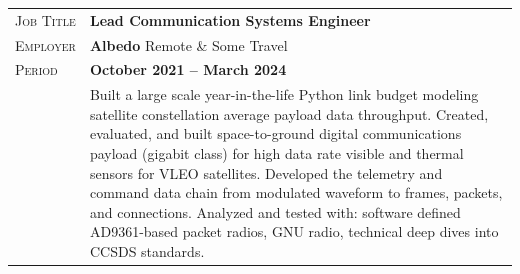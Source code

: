 \documentclass[a4paper, oneside, final]{scrartcl}
\newcommand{\gray}{\rowcolor[gray]{.90}} %
\begin{document}
\begin{center}
\begin{tabularx}{0.97\linewidth}{>{\raggedleft\scshape}p{2cm}X}
\gray Job Title & \textbf{Lead Communication Systems Engineer}\\
\gray Employer & \textbf{Albedo} \hfill Remote \& Some Travel\\
\gray Period & \textbf{October 2021 -- March 2024}\\
&
\vspace{-0.15 cm}
Built a large scale year-in-the-life Python link budget modeling satellite constellation average payload data throughput.  
\newline
\newline
Created, evaluated, and built space-to-ground digital communications payload (gigabit class) for high data rate visible and thermal sensors for VLEO satellites. Developed the telemetry and command data chain from modulated waveform to frames, packets, and connections. Analyzed and tested with: software defined AD9361-based packet radios, GNU radio, technical deep dives into CCSDS standards.

\end{tabularx}
\end{center}
\end{document}
